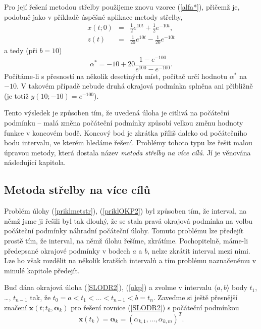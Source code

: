 \documentclass[a4paper, 12pt]{book}
\theoremstyle{definition}
\def\vc#1{\mathbf{\boldsymbol{#1}}}     %
\begin{document}
Pro její řešení metodou střelby použijeme znovu vzorec (\ref{alfa*}), přičemž je, 
podobně jako v příkladě úspěšné aplikace metody střelby,
\begin{eqnarray*}
x(t;0)&=&\frac 12 e^{10t}+\frac 12 e^{-10t},\\
z(t)&=&\frac 1{20}e^{10t}-\frac 1{20}e^{-10t}
\end{eqnarray*}
a tedy (při $b=10$)
\begin{displaymath}
\alpha^*=-10+ 20\frac{1-e^{-100}}{e^{100}-e^{-100}}.
\end{displaymath}
Počítáme-li s přesností na několik desetiných míst, počítač určí hodnotu
$\alpha^*$ na $-10$. V takovém případě nebude druhá okrajová podmínka splněna
ani přibližně (je totiž $y(10;-10)=e^{-100}$).

Tento výsledek je způsoben tím, že uvedená úloha je citlivá na počáteční 
podmínku -- malá změna počáteční podmínky způsobí velkou změnu hodnoty
funkce v koncovém bodě. Koncový bod je zkrátka příliš daleko od počátečního 
bodu intervalu, ve kterém hledáme řešení. Problémy tohoto typu lze řešit 
malou úpravou metody, která dostala název {\em metoda střelby na více cílů}. 
Jí je věnována následující kapitola.

\subsection{Metoda střelby na více cílů}
Problém úlohy (\ref{priklmetstr}), (\ref{priklOKP2}) byl způsoben tím, že 
interval, na němž jsme 
ji řešili byl tak dlouhý, že se stala pravá okrajová podmínka 
na volbu počáteční podmínky náhradní počáteční úlohy. Tomuto problému lze předejít 
prostě tím, že interval, na němž úlohu řešíme, zkrátíme. Pochopitelně, máme-li
předepsané okrajové podmínky v bodech $a$ a $b$, nelze zkrátit interval mezi nimi.
Lze ho však rozdělit na několik kratších intervalů a tím problému naznačenému 
v minulé kapitole předejít.

Buď dána okrajová úloha (\ref{SLODR2}), (\ref{okp}) a zvolme v intervalu 
$\langle a,b\rangle$ body $t_1$, \dots, $t_{n-1}$ tak, že $t_0=a<t_1<\dots<t_{n-1}<b=t_n$.
Zaveďme si ještě přesnější značení $\vc x(t;t_k,\vc\alpha_k)$ pro řešení rovnice
(\ref{SLODR2}) s počáteční podmínkou
\begin{displaymath}
\vc x(t_k)=\vc\alpha_k=(\alpha_{k,1},\dots,\alpha_{k,m})^T.
\end{displaymath}
\end{document}

